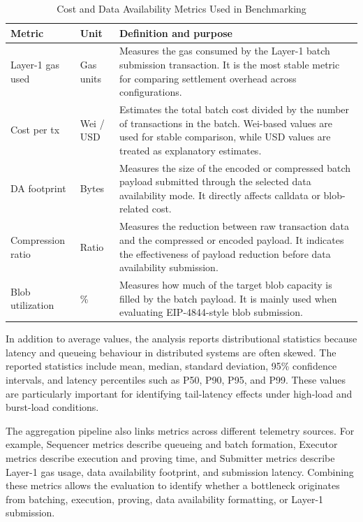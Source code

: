 \begin{table}[!htbp]
\centering
\caption{Cost and Data Availability Metrics Used in Benchmarking}
\label{tab:cost_da_metrics}
\footnotesize
\setlength{\tabcolsep}{4pt}
\renewcommand{\arraystretch}{1.18}
\begin{tabularx}{\textwidth}{@{}p{}p{}Y@{}}
\toprule
\textbf{Metric} & \textbf{Unit} & \textbf{Definition and purpose} \\
\midrule

Layer-1 gas used 
& Gas units 
& Measures the gas consumed by the Layer-1 batch submission transaction. It is the most stable metric for comparing settlement overhead across configurations. \\

\addlinespace

Cost per tx 
& Wei / USD 
& Estimates the total batch cost divided by the number of transactions in the batch. Wei-based values are used for stable comparison, while USD values are treated as explanatory estimates. \\

\addlinespace

DA footprint 
& Bytes 
& Measures the size of the encoded or compressed batch payload submitted through the selected data availability mode. It directly affects calldata or blob-related cost. \\

\addlinespace

Compression ratio 
& Ratio 
& Measures the reduction between raw transaction data and the compressed or encoded payload. It indicates the effectiveness of payload reduction before data availability submission. \\

\addlinespace

Blob utilization 
& \% 
& Measures how much of the target blob capacity is filled by the batch payload. It is mainly used when evaluating EIP-4844-style blob submission. \\

\bottomrule
\end{tabularx}
\normalsize
\end{table}


In addition to average values, the analysis reports distributional statistics because latency and queueing behaviour in distributed systems are often skewed. The reported statistics include mean, median, standard deviation, 95\% confidence intervals, and latency percentiles such as P50, P90, P95, and P99. These values are particularly important for identifying tail-latency effects under high-load and burst-load conditions.

The aggregation pipeline also links metrics across different telemetry sources. For example, Sequencer metrics describe queueing and batch formation, Executor metrics describe execution and proving time, and Submitter metrics describe Layer-1 gas usage, data availability footprint, and submission latency. Combining these metrics allows the evaluation to identify whether a bottleneck originates from batching, execution, proving, data availability formatting, or Layer-1 submission.
